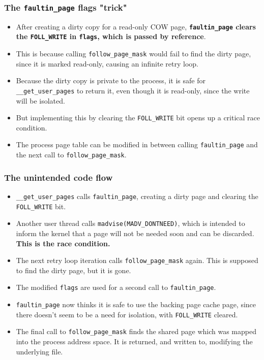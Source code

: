 \documentclass{beamer}
\newcommand{\code}[1]{\texttt{#1}}
\begin{document}
\begin{frame}
\frametitle{The \code{faultin\_page} flags "trick"}
\begin{itemize}

\item
After creating a dirty copy for a read-only COW page, \textbf{\code{faultin\_page} clears the \code{FOLL\_WRITE} in \code{flags}, which is passed by reference}.

\item
This is because calling \code{follow\_page\_mask} would fail to find the dirty page, since it is marked read-only, causing an infinite retry loop.

\item
Because the dirty copy is private to the process, it is safe for \code{\_\_get\_user\_pages} to return it, even though it is read-only, since the write will be isolated.

\item
But implementing this by clearing the \code{FOLL\_WRITE} bit opens up a critical race condition.

\item
The process page table can be modified in between calling \code{faultin\_page} and the next call to \code{follow\_page\_mask}.

\end{itemize}
\end{frame}

\begin{frame}
\frametitle{The unintended code flow}
\begin{itemize}

\item
\code{\_\_get\_user\_pages} calls \code{faultin\_page}, creating a dirty page and clearing the \code{FOLL\_WRITE} bit.

\item
Another user thread calls \code{madvise(MADV\_DONTNEED)}, which is intended to inform the kernel that a page will not be needed soon and can be discarded. \textbf{This is the race condition.}

\item
The next retry loop iteration calls \code{follow\_page\_mask} again. This is supposed to find the dirty page, but it is gone.

\item
The modified \code{flags} are used for a second call to \code{faultin\_page}.

\item
\code{faultin\_page} now thinks it is safe to use the backing page cache page, since there doesn't seem to be a need for isolation, with \code{FOLL\_WRITE} cleared.

\item
The final call to \code{follow\_page\_mask} finds the shared page which was mapped into the process address space. It is returned, and written to, modifying the underlying file.

\end{itemize}
\end{frame}
\end{document}
